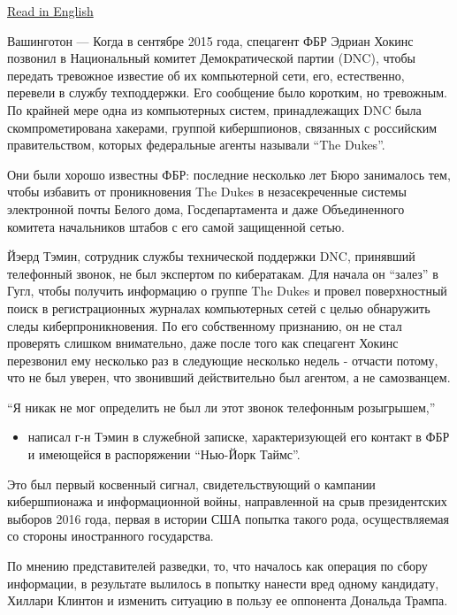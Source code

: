 \href{https://www.nytimes.com/2016/12/13/us/politics/russia-hack-election-dnc.html}{Read
in English}

Вашинготон --- Когда в сентябре 2015 года, спецагент ФБР Эдриан Хокинс
позвонил в Национальный комитет Демократической партии (DNC), чтобы
передать тревожное известие об их компьютерной сети, его, естественно,
перевели в службу техподдержки. Его сообщение было коротким, но
тревожным. По крайней мере одна из компьютерных систем, принадлежащих
DNC была скомпрометирована хакерами, группой кибершпионов, связанных с
российским правительством, которых федеральные агенты называли ``The
Dukes''.

Они были хорошо известны ФБР: последние несколько лет Бюро занималось
тем, чтобы избавить от проникновения The Dukes в незасекреченные системы
электронной почты Белого дома, Госдепартамента и даже Объединенного
комитета начальников штабов с его самой защищенной сетью.

Йэерд Тэмин, сотрудник службы технической поддержки DNC, принявший
телефонный звонок, не был экспертом по кибератакам. Для начала он
``залез'' в Гугл, чтобы получить информацию о группе The Dukes и провел
поверхностный поиск в регистрационных журналах компьютерных сетей с
целью обнаружить следы киберпроникновения. По его собственному
признанию, он не стал проверять слишком внимательно, даже после того как
спецагент Хокинс перезвонил ему несколько раз в следующие несколько
недель - отчасти потому, что не был уверен, что звонивший действительно
был агентом, а не самозванцем.

``Я никак не мог определить не был ли этот звонок телефонным
розыгрышем,''

\begin{itemize}
\tightlist
\item
  написал г-н Тэмин в служебной записке, характеризующей его контакт в
  ФБР и имеющейся в распоряжении ``Нью-Йорк Таймс''.
\end{itemize}

Это был первый косвенный сигнал, свидетельствующий о кампании
кибершпионажа и информационной войны, направленной на срыв президентских
выборов 2016 года, первая в истории США попытка такого рода,
осуществляемая со стороны иностранного государства.

По мнению представителей разведки, то, что началось как операция по
сбору информации, в результате вылилось в попытку нанести вред одному
кандидату, Хиллари Клинтон и изменить ситуацию в пользу ее оппонента
Дональда Трампа.

